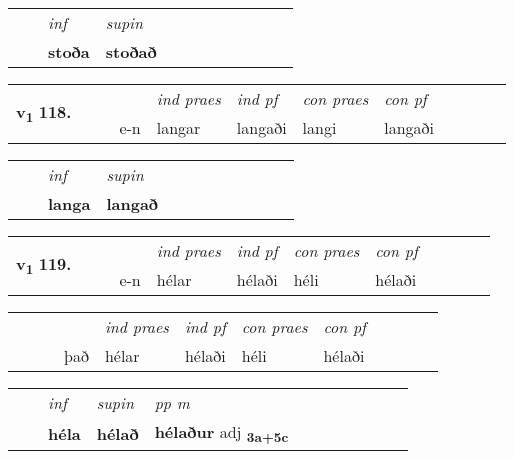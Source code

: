 \begin{tabular}{llllllllllll}
 & & \textit{inf}      & \textit{supin}       \\*
  & & \textbf{stoða}       &  \textbf{stoðað}   \\*
\cmidrule{1-12}
\end{tabular}





\begin{tabular}{llllllllllll}\toprule
\multirow{4}{*}{{{\textbf{v{\textsubscript{1}}} \Large{\textbf{118.}}}}}  & &  & &  \textit{ind praes} & \textit{ind pf} & \textit{con praes} & \textit{con pf} \\*
&  & & e-n & langar & langaði & langi & langaði \\*
\cmidrule{5-9}
\end{tabular}


\begin{tabular}{llllllllllll}
 & & \textit{inf}      & \textit{supin}       \\*
  & & \textbf{langa}       &  \textbf{langað}   \\*
\cmidrule{1-12}
\end{tabular}





\begin{tabular}{llllllllllll}\toprule
\multirow{4}{*}{{{\textbf{v{\textsubscript{1}}} \Large{\textbf{119.}}}}}  & &  & &  \textit{ind praes} & \textit{ind pf} & \textit{con praes} & \textit{con pf} \\*
&  & & e-n & hélar & hélaði & héli & hélaði \\*
\cmidrule{5-9}
\end{tabular}


\begin{tabular}{llllllllllll}
 & &  & &  \textit{ind praes} & \textit{ind pf} & \textit{con praes} & \textit{con pf} \\*
&  & & það & hélar & hélaði & héli & hélaði \\*
\cmidrule{5-9}
\end{tabular}


\begin{tabular}{llllllllllll}
 & & \textit{inf}      & \textit{supin}  & \textit{pp m}     \\*
  & & \textbf{héla}       &  \textbf{hélað}  & \textbf{hélaður} adj \textbf{\textsubscript{3a+5c}} \\*
\cmidrule{1-12}
\end{tabular}





